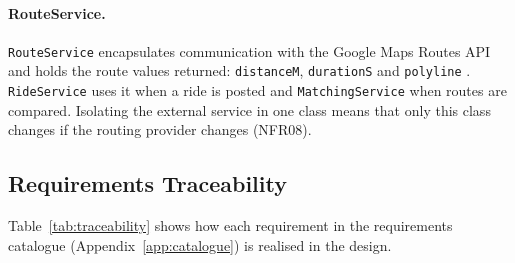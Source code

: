 \paragraph{RouteService.} \texttt{RouteService} encapsulates communication with the Google Maps Routes API and holds the route values returned: \texttt{distanceM}, \texttt{durationS} and \texttt{polyline} \citep{google2026a}. \texttt{RideService} uses it when a ride is posted and \texttt{MatchingService} when routes are compared. Isolating the external service in one class means that only this class changes if the routing provider changes (NFR08).

\subsection{Requirements Traceability}

Table~\ref{tab:traceability} shows how each requirement in the requirements catalogue (Appendix~\ref{app:catalogue}) is realised in the design.

